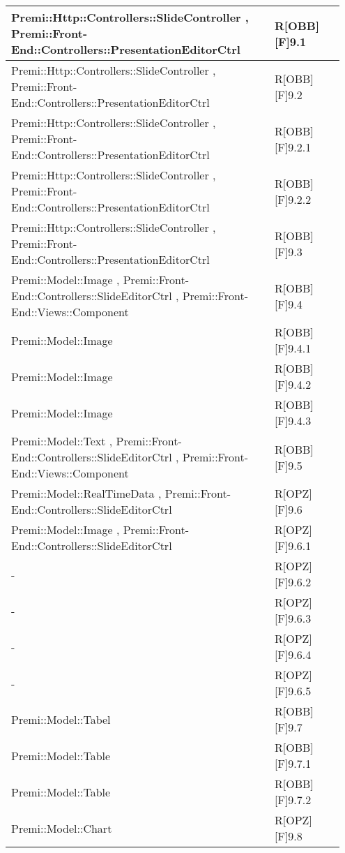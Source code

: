\begin{table}[h]
	\begin{center}
		\begin{tabular}{|p{0.75\linewidth}|p{0.2\linewidth}|}
			\toprule
			Premi::Http::Controllers::SlideController , Premi::Front-End::Controllers::PresentationEditorCtrl & R[OBB][F]9.1 \\
		\midrule
			Premi::Http::Controllers::SlideController , Premi::Front-End::Controllers::PresentationEditorCtrl & R[OBB][F]9.2 \\
		\midrule
			Premi::Http::Controllers::SlideController , Premi::Front-End::Controllers::PresentationEditorCtrl & R[OBB][F]9.2.1 \\
		\midrule
			Premi::Http::Controllers::SlideController , Premi::Front-End::Controllers::PresentationEditorCtrl & R[OBB][F]9.2.2 \\
		\midrule
			Premi::Http::Controllers::SlideController , Premi::Front-End::Controllers::PresentationEditorCtrl & R[OBB][F]9.3 \\
		\midrule
			Premi::Model::Image , Premi::Front-End::Controllers::SlideEditorCtrl , Premi::Front-End::Views::Component & R[OBB][F]9.4 \\
		\midrule
			Premi::Model::Image & R[OBB][F]9.4.1 \\
		\midrule
			Premi::Model::Image & R[OBB][F]9.4.2 \\
		\midrule
			Premi::Model::Image & R[OBB][F]9.4.3 \\
		\midrule
			Premi::Model::Text , Premi::Front-End::Controllers::SlideEditorCtrl , Premi::Front-End::Views::Component & R[OBB][F]9.5 \\
		\midrule
			Premi::Model::RealTimeData , Premi::Front-End::Controllers::SlideEditorCtrl & R[OPZ][F]9.6 \\
		\midrule
			Premi::Model::Image , Premi::Front-End::Controllers::SlideEditorCtrl & R[OPZ][F]9.6.1 \\
		\midrule
			- & R[OPZ][F]9.6.2 \\
		\midrule
			- & R[OPZ][F]9.6.3 \\
		\midrule
			- & R[OPZ][F]9.6.4 \\
		\midrule
			- & R[OPZ][F]9.6.5 \\
		\midrule
			Premi::Model::Tabel & R[OBB][F]9.7 \\
		\midrule
			Premi::Model::Table & R[OBB][F]9.7.1 \\
		\midrule
			Premi::Model::Table & R[OBB][F]9.7.2 \\
		\midrule
			Premi::Model::Chart & R[OPZ][F]9.8 \\

\end{tabular}
\end{center}
\end{table}
